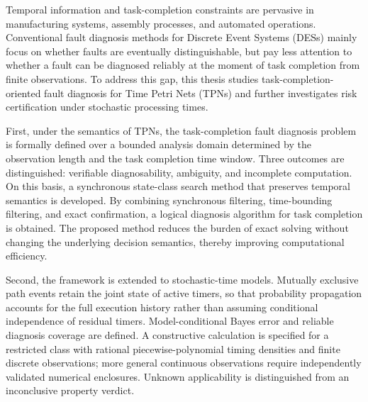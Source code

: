 \documentclass[master,fontset=ubuntu]{shnuthesis}
\theoremstyle{definition}
\begin{document}

\begin{enabstract}
Temporal information and task-completion constraints are pervasive in manufacturing systems, assembly processes, and automated operations. Conventional fault diagnosis methods for Discrete Event Systems (DESs) mainly focus on whether faults are eventually distinguishable, but pay less attention to whether a fault can be diagnosed reliably at the moment of task completion from finite observations. To address this gap, this thesis studies task-completion-oriented fault diagnosis for Time Petri Nets (TPNs) and further investigates risk certification under stochastic processing times.

First, under the semantics of TPNs, the task-completion fault diagnosis problem is formally defined over a bounded analysis domain determined by the observation length and the task completion time window. Three outcomes are distinguished: verifiable diagnosability, ambiguity, and incomplete computation. On this basis, a synchronous state-class search method that preserves temporal semantics is developed. By combining synchronous filtering, time-bounding filtering, and exact confirmation, a logical diagnosis algorithm for task completion is obtained. The proposed method reduces the burden of exact solving without changing the underlying decision semantics, thereby improving computational efficiency.

Second, the framework is extended to stochastic-time models. Mutually exclusive path events retain the joint state of active timers, so that probability propagation accounts for the full execution history rather than assuming conditional independence of residual timers. Model-conditional Bayes error and reliable diagnosis coverage are defined. A constructive calculation is specified for a restricted class with rational piecewise-polynomial timing densities and finite discrete observations; more general continuous observations require independently validated numerical enclosures. Unknown applicability is distinguished from an inconclusive property verdict.


\end{enabstract}
\end{document}
